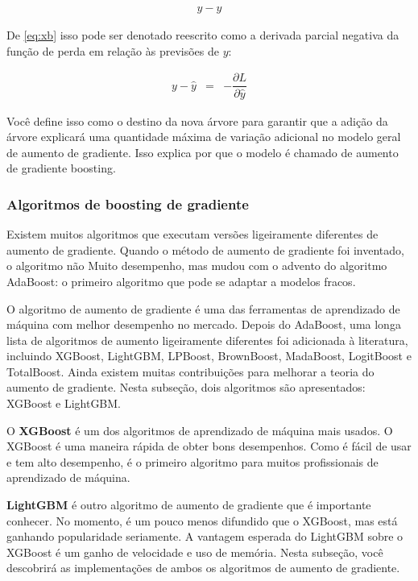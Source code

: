 \begin{eqnarray}
	y-\hat{y}\label{eq:xb}
\end{eqnarray}

De \eqref{eq:xb} isso pode ser denotado reescrito como a derivada parcial negativa da função de perda em relação às previsões de $y$:

\begin{eqnarray}
	y-\hat{y}&=&-\dfrac{\partial L}{\partial \hat{y}}\label{eq:xb2}
\end{eqnarray}

Você define isso como o destino da nova árvore para garantir que a adição da árvore explicará uma quantidade máxima de variação adicional no modelo geral de aumento de gradiente. Isso explica por que o modelo é chamado de aumento de gradiente boosting.

\subsubsection{Algoritmos de boosting de gradiente}

Existem muitos algoritmos que executam versões ligeiramente diferentes de aumento de gradiente. Quando o método de aumento de gradiente foi inventado, o algoritmo não Muito desempenho, mas mudou com o advento do algoritmo AdaBoost: o primeiro algoritmo que pode se adaptar a modelos fracos. 

O algoritmo de aumento de gradiente é uma das ferramentas de aprendizado de máquina com melhor desempenho no mercado. Depois do AdaBoost, uma longa lista de algoritmos de aumento ligeiramente diferentes foi adicionada à literatura, incluindo XGBoost, LightGBM, LPBoost, BrownBoost, MadaBoost, LogitBoost e TotalBoost. Ainda existem muitas contribuições para melhorar a teoria do aumento de gradiente. Nesta subseção, dois algoritmos são apresentados: XGBoost e LightGBM.

O \textbf{XGBoost} é um dos algoritmos de aprendizado de máquina mais usados. O XGBoost é uma maneira rápida de obter bons desempenhos. Como é fácil de usar e tem alto desempenho, é o primeiro algoritmo para muitos profissionais de aprendizado de máquina.

\textbf{LightGBM} é outro algoritmo de aumento de gradiente que é importante conhecer. No momento, é um pouco menos difundido que o XGBoost, mas está ganhando popularidade seriamente.
A vantagem esperada do LightGBM sobre o XGBoost é um ganho de velocidade e uso de memória.
Nesta subseção, você descobrirá as implementações de ambos os algoritmos de aumento de gradiente.

